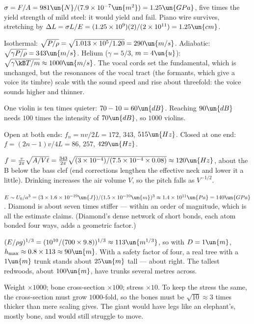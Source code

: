 
 $\sigma = F/A = 981\un{N}/(7.9\times10^{-7}\un{m^2}) = 1.25\un{GPa}$, five times the yield strength of mild steel: it would yield and fail. Piano wire survives, stretching by $\Delta L = \sigma L/E = (1.25\times10^9)(2)/(2\times10^{11}) = 1.25\un{cm}$.

 Isothermal: $\sqrt{P/\rho} = \sqrt{1.013\times10^5/1.20} = 290\un{m/s}$. Adiabatic: $\sqrt{\gamma P/\rho} = 343\un{m/s}$. Helium ($\gamma = 5/3$, $m = 4\un{u}$): $\sqrt{\gamma\kB T/m}\approx1000\un{m/s}$. The vocal cords set the fundamental, which is unchanged, but the resonances of the vocal tract (the formants, which give a voice its timbre) scale with the sound speed and rise about threefold: the voice sounds higher and thinner.

 One violin is ten times quieter: $70 - 10 = 60\un{dB}$. Reaching $90\un{dB}$ needs $100$ times the intensity of $70\un{dB}$, so $1000$ violins.

 Open at both ends: $f_n = nv/2L = 172$, $343$, $515\un{Hz}$. Closed at one end: $f = (2n-1)v/4L = 86$, $257$, $429\un{Hz}$.

 $f = \frac{v}{2\pi}\sqrt{A/V\ell} = \frac{343}{2\pi}\sqrt{(3\times10^{-4})/(7.5\times10^{-4}\times0.08)}\approx120\un{Hz}$, about the B below the bass clef (end corrections lengthen the effective neck and lower it a little). Drinking increases the air volume $V$, so the pitch falls as $V^{-1/2}$.

 $E\sim U_0/a^3 = (3\times1.6\times10^{-19}\un{J})/(1.5\times10^{-10}\un{m})^3\approx1.4\times10^{11}\un{Pa} = 140\un{GPa}$. Diamond is about seven times stiffer --- within an order of magnitude, which is all the estimate claims. (Diamond's dense network of short bonds, each atom bonded four ways, adds a geometric factor.)

 $(E/\rho g)^{1/3} = (10^{10}/(700\times9.8))^{1/3}\approx113\un{m^{1/3}}$, so with $D = 1\un{m}$, $h_{\max}\approx0.8\times113\approx90\un{m}$. With a safety factor of four, a real tree with a $1\un{m}$ trunk stands about $25\un{m}$ tall --- about right. The tallest redwoods, about $100\un{m}$, have trunks several metres across.

 Weight $\times1000$; bone cross-section $\times100$; stress $\times10$. To keep the stress the same, the cross-section must grow $1000$-fold, so the bones must be $\sqrt{10}\approx3$ times thicker than mere scaling gives. The giant would have legs like an elephant's, mostly bone, and would still struggle to move.

